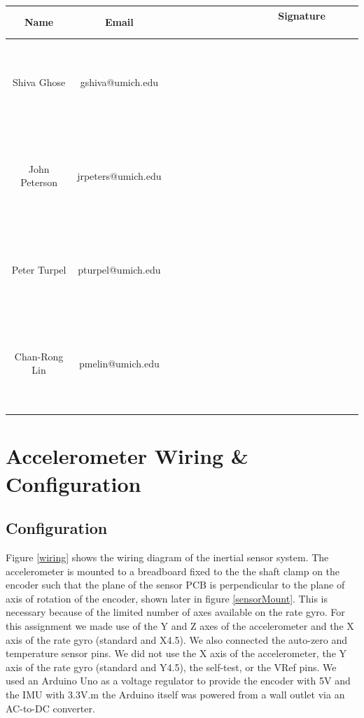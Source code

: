 \documentclass{article}
\theoremstyle{plain}
\theoremstyle{definition}
\theoremstyle{remark}
\begin{document}
\begin{table}[h]
\begin{center}
    \begin{tabular}{|c|c|c|}
        \hline
        \textbf{Name} & \textbf{Email}     & \textbf{ \ \ \ \ \  \ \  \ \ \ \ \  \ \ Signature  \ \ \ \ \  \ \ \ \ \ \ \  \ \ } \\ \hline
        	~& ~& ~\\
	~& ~& ~\\
	Shiva Ghose   & gshiva@umich.edu   & ~                  \\
	~& ~& ~\\
	~& ~& ~\\ \hline 
	~& ~& ~\\
	~& ~& ~\\
        John Peterson & jrpeters@umich.edu & ~                  \\ 
	~& ~& ~\\
	~& ~& ~\\ \hline 
	~& ~& ~\\
	~& ~& ~\\
        Peter Turpel   & pturpel@umich.edu & ~                  \\
	~& ~& ~\\
	~& ~& ~\\ \hline 
	~& ~& ~\\
	~& ~& ~\\
        Chan-Rong Lin   & pmelin@umich.edu & ~                  \\
	~& ~& ~\\
	~& ~& ~\\ \hline 
        \hline
    \end{tabular}
\end{center}
\end{table}

\newpage

\section{Accelerometer Wiring \& Configuration} 

\subsection{Configuration}

Figure \ref{wiring} shows the wiring diagram of the inertial sensor system. The accelerometer is mounted to a breadboard fixed to the the shaft clamp on the encoder such that the plane of the sensor PCB is perpendicular to the plane of axis of rotation of the encoder, shown later in figure \ref{sensorMount}.  This is necessary because of the limited number of axes available on the rate gyro.  For this assignment we made use of the Y and Z axes of the accelerometer and the X axis of the rate gyro (standard and X4.5). We also connected the auto-zero and temperature sensor pins. We did not use the X axis of the accelerometer, the Y axis of the rate gyro (standard and Y4.5), the self-test, or the VRef pins. We used an Arduino Uno as a voltage regulator to provide the encoder with 5V and the IMU with 3.3V.m the Arduino itself was powered from a wall outlet via an AC-to-DC converter.   \\
\end{document}
